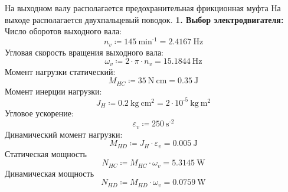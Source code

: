 \documentclass{article}
\newcommand{\defeq}{\coloneq} %
\begin{document}
\colorbox[HTML]{000000}{На выходном валу располагается предохранительная фрикционная муфта}\newline
\colorbox[HTML]{000000}{На выходе располагается двухпальцевый поводок.}\newline
\colorbox[HTML]{000000}{\textbf{1. Выбор электродвигателя:}}\newline
\colorbox[HTML]{000000}{Число оборотов выходного вала:}\newline
\begin{equation*}
n_{v} \defeq 145 \: \mathrm{min}^{ \operatorname{-} 1} = {2.4167 \: \mathrm{Hz}}
\end{equation*}
\colorbox[HTML]{000000}{Угловая скорость вращения выходного вала:}\newline
\begin{equation*}
ω_{v} \defeq 2 \cdot {\pi} \cdot n_{v} = {15.1844 \: \mathrm{Hz}}
\end{equation*}
\colorbox[HTML]{000000}{Момент нагрузки статический:}\newline
\begin{equation*}
M_{HC} \defeq 35 \: \mathrm{N} \: \mathrm{cm} = {0.35 \: \mathrm{J}}
\end{equation*}
\colorbox[HTML]{000000}{Момент инерции нагрузки:}\newline
\begin{equation*}
J_{H} \defeq 0.2 \: \mathrm{kg} \: \mathrm{cm}^{2} = {2 \cdot 10^{ \operatorname{-} 5} \: \mathrm{kg} \: \mathrm{m}^{2}}
\end{equation*}
\colorbox[HTML]{000000}{Угловое ускорение:}\newline
\begin{equation*}
ε_{v} \defeq 250 \: \mathrm{s}^{ \operatorname{-} 2}
\end{equation*}
\colorbox[HTML]{000000}{Динамический момент нагрузки:}\newline
\begin{equation*}
M_{HD} \defeq J_{H} \cdot ε_{v} = {0.005 \: \mathrm{J}}
\end{equation*}
\colorbox[HTML]{000000}{Статическая мощность}\newline
\begin{equation*}
N_{HC} \defeq M_{HC} \cdot ω_{v} = {5.3145 \: \mathrm{W}}
\end{equation*}
\colorbox[HTML]{000000}{Динамическая мощность}\newline
\begin{equation*}
N_{HD} \defeq M_{HD} \cdot ω_{v} = {0.0759 \: \mathrm{W}}
\end{equation*}
\end{document}
